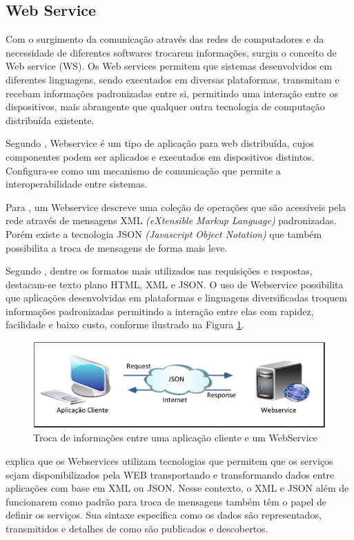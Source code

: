 \documentclass[12pt]{article}
\begin{document}
\subsection{Web Service}

Com o surgimento da comunicação através das redes de computadores e da necessidade
de diferentes softwares trocarem informações, surgiu o conceito de Web service (WS).
Os Web services permitem que sistemas desenvolvidos em diferentes linguagens,
sendo executados em diversas plataformas, transmitam e recebam informações
padronizadas entre si, permitindo uma interação entre os dispositivos, mais abrangente
que qualquer outra tecnologia de computação distribuída existente.

Segundo \cite{kalin:09}, Webservice é um tipo de aplicação para web distribuída,
cujos componentes podem ser aplicados e executados em dispositivos distintos.
Configura-se como um mecanismo de comunicação que permite a interoperabilidade
entre sistemas. 

Para \cite{kreger:01}, um Webservice descreve uma coleção de operações
que são acessíveis pela rede através de mensagens XML \textit{(eXtensible Markup Language)}
padronizadas. Porém existe a tecnologia JSON \textit{(Javascript Object Notation)} que
também possibilita a troca de mensagens de forma mais leve. 

Segundo \cite{sandoval:09}, dentre os
formatos mais utilizados nas requisições e respostas, destacam-se texto plano
HTML, XML e JSON. O uso de Webservice
possibilita que aplicações desenvolvidas em plataformas e linguagens diversificadas
troquem informações padronizadas permitindo a interação entre elas com rapidez,
facilidade e baixo custo, conforme ilustrado na Figura \ref{fig:exampleFigura1}.

\begin{figure}[ht]
	\centering
	\includegraphics[width=.8\textwidth]{figura1.png}
	\caption{Troca de informações entre uma aplicação cliente e um WebService}
	\label{fig:exampleFigura1}
\end{figure}

\cite{souza04} explica que os Webservices utilizam tecnologias que permitem que
os serviços sejam disponibilizados pela WEB transportando e transformando dados
entre aplicações com base em XML ou JSON. Nesse contexto, o XML e JSON além de
funcionarem como padrão para troca de mensagens também têm o papel de definir os
serviços. Sua sintaxe especifica como os dados são representados, transmitidos e
detalhes de como são publicados e descobertos.
\end{document}
